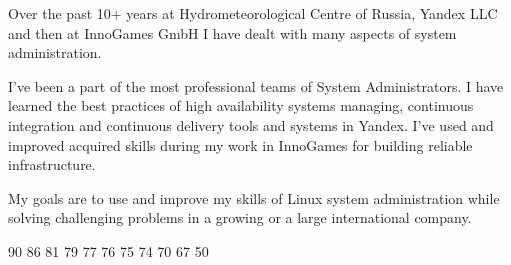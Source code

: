 \documentclass[11pt]{developercv} %
\begin{document}
\vspace{1.5cm}



\begin{minipage}[t]{0.48\textwidth} %
  \parindent=2mm
  Over the past 10+ years at Hydrometeorological Centre of Russia, Yandex LLC and then at InnoGames GmbH I have dealt with many aspects of system administration.

  I've been a part of the most professional teams of System Administrators. I have learned the best practices of high availability systems managing, continuous integration and continuous delivery tools and systems in Yandex. I've used and improved acquired skills during my work in InnoGames for building reliable infrastructure.

  My goals are to use and improve my skills of Linux system administration while solving challenging problems in a growing or a large international company.
\end{minipage}
\hfill %
\begin{minipage}[t]{0.5\textwidth} %
  \vspace{-\baselineskip} %
  \small
  \begin{barchart}{5}
                  {90}
         {86}
                  {81}
     {79}
          {77}
                  {76}
                  {75}
                    {74}
                   {70}
                 {67}
               {50}
  \end{barchart}
\end{minipage}

\begin{center}
\end{center}

\vspace{1.5cm}
\end{document}
